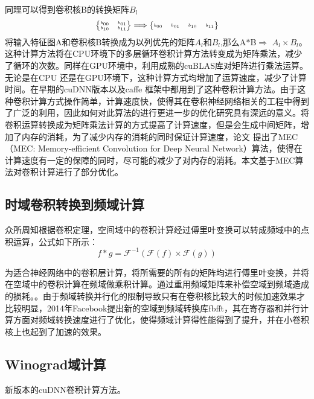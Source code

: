 \documentclass[a4paper,11pt,onecolumn,towside]{article}
\begin{document}
\begin{CJK*}{GBK}{song}
\begin{multicols}{2}
同理可以得到卷积核B的转换矩阵$B_{l}$
$$\tiny
    \left\{
    \begin{matrix}
    \begin{matrix}
    b_{00} & b_{01} \\
    b_{10} & b_{11} \\
    \end{matrix}
    \end{matrix}
    \right\} \Longrightarrow
    \left\{
    \begin{matrix}
    b_{00}&b_{01}&b_{10}&b_{11}
    \end{matrix}
    \right\}
$$
将输入特征图A和卷积核B转换成为以列优先的矩阵$A_{l}$和$ B_{l}$,那么A$\ast$B$\Longrightarrow$ $A_{l} \times B_{l}$。这种计算方法将在CPU环境下的多层循环卷积计算方法转变成为矩阵乘法，减少了循环的次数。同样在GPU环境中，利用成熟的cuBLAS库对矩阵进行乘法运算。无论是在CPU 还是在GPU环境下，这种计算方式均增加了运算速度，减少了计算时间。在早期的cuDNN\cite{im2col+GEMM}版本以及caffe\cite{jia2014caffe} 框架中都用到了这种卷积计算方法。由于这种卷积计算方式操作简单，计算速度快，使得其在卷积神经网络相关的工程中得到了广泛的利用\cite{darknet13}\cite{jia2014caffe}，因此如何对此算法的进行更进一步的优化研究具有深远的意义。将卷积运算转换成为矩阵乘法计算的方式提高了计算速度，但是会生成中间矩阵，增加了内存的消耗，为了减少内存的消耗的同时保证计算速度，论文\cite{MEC} 提出了MEC（MEC: Memory-efficient Convolution for Deep Neural Network）算法，使得在计算速度有一定的保障的同时，尽可能的减少了对内存的消耗。本文基于MEC\cite{MEC}算法对卷积计算进行了部分优化。
\subsection{时域卷积转换到频域计算}
众所周知根据卷积定理，空间域中的卷积计算经过傅里叶变换可以转成频域中的点积运算，公式如下所示：
$$
f \ast g = \mathcal{F}^{-1}{(\mathcal{F}{(f)}\times \mathcal{F}{(g)})}
$$



为适合神经网络中的卷积层计算，将所需要的所有的矩阵均进行傅里叶变换，并将在空域中的卷积计算在频域做乘积计算。通过重用频域矩阵来补偿空域到频域造成的损耗。\cite{FFT}。由于频域转换并行化的限制导致只有在卷积核比较大的时候加速效果才比较明显，2014年Facebook提出新的空域到频域转换库fbfft，其在寄存器和并行计算方面对频域转换速度进行了优化，使得频域计算得性能得到了提升，并在小卷积核上也起到了加速的效果\cite{FBFFT}。
\subsection{Winograd域计算}
新版本的cuDNN卷积计算方法。

\end{multicols}
\end{CJK*}
\end{document}
